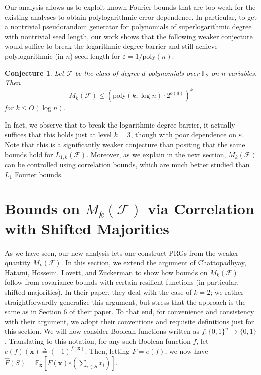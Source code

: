 \documentclass[10pt,a4paper]{article}
\newcommand{\eps}{\varepsilon}
\newtheorem{conjecture}[theorem]{Conjecture}
\theoremstyle{definition}
\begin{document}
Our analysis allows us to exploit known Fourier bounds that are too weak for the existing analyses to obtain polylogarithmic error dependence. In particular, to get a nontrivial pseudorandom generator for polynomials of superlogarithmic degree with nontrivial seed length, our work shows that the following weaker conjecture would suffice to break the logarithmic degree barrier and still achieve polylogarithmic (in $n$) seed length for $\eps=1/\mathrm{poly}(n)$:
\begin{conjecture}\label{con:mk}
Let $\mathcal{F}$ be the class of degree-$d$ polynomials over $\mathbb{F}_2$ on $n$ variables. Then 
\begin{equation*}
    M_{k}(\mathcal{F})\leq (\mathrm{poly}(k,\log n)\cdot 2^{o(d)})^k
\end{equation*}
for $k\leq O(\log n)$.
\end{conjecture}
In fact, we observe that to break the logarithmic degree barrier, it actually suffices that this holds just at level $k=3$, though with poor dependence on $\eps$. Note that this is a significantly weaker conjecture than positing that the same bounds hold for $L_{1,k}(\mathcal{F})$. Moreover, as we explain in the next section, $M_k(\mathcal{F})$ can be controlled using correlation bounds, which are much better studied than $L_1$ Fourier bounds.

\section{Bounds on $M_k(\mathcal{F})$ via Correlation with Shifted Majorities}
\label{sec:corrsec}
As we have seen, our new analysis lets one construct PRGs from the weaker quantity $M_k(\mathcal{F})$.  In this section, we extend the argument of Chattopadhyay, Hatami, Hosseini, Lovett, and Zuckerman \cite{xorlemma} to show how bounds on $M_k(\mathcal{F})$ follow from covariance bounds with certain resilient functions (in particular, shifted majorities). In their paper, they deal with the case of $k=2$; we rather straightforwardly generalize this argument, but stress that the approach is the same as in Section 6 of their paper. To that end, for convenience and consistency with their argument, we adopt their conventions and requisite definitions just for this section. We will now consider Boolean functions written as $f:\{0,1\}^n\to \{0,1\}$. Translating to this notation, for any such Boolean function $f$, let $e(f)(\mathbf{x})\triangleq (-1)^{f(\mathbf{x})}$. Then, letting $F=e(f)$, we now have $\hat{F}(S)=\mathbb{E}_{\mathbf{x}}[F(\mathbf{x})e(\sum_{i\in S} x_i)]$.
\end{document}
